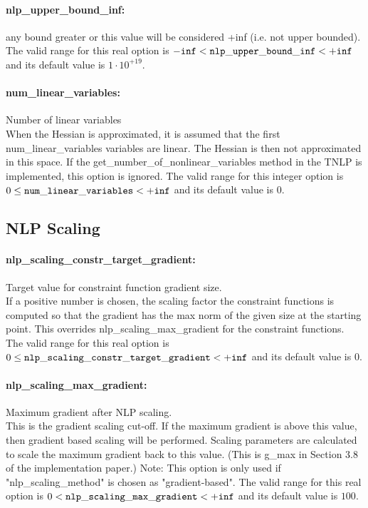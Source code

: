 \paragraph{nlp\_upper\_bound\_inf:}\label{opt:nlp_upper_bound_inf} any bound greater or this value will be considered +inf (i.e. not upper bounded). \\
 The valid range for this real option is 
${\tt -inf} <  {\tt nlp\_upper\_bound\_inf } <  {\tt +inf}$
and its default value is $1 \cdot 10^{+19}$.


\paragraph{num\_linear\_variables:}\label{opt:num_linear_variables} Number of linear variables \\
 When the Hessian is approximated, it is assumed that the first num\_linear\_variables variables are linear.  The Hessian is then not approximated in this space.  If the get\_number\_of\_nonlinear\_variables method in the TNLP is implemented, this option is ignored. The valid range for this integer option is
$0 \le {\tt num\_linear\_variables } <  {\tt +inf}$
and its default value is $0$.


\subsection{NLP Scaling}
\label{sec:NLPScaling}
\paragraph{nlp\_scaling\_constr\_target\_gradient:}\label{opt:nlp_scaling_constr_target_gradient} Target value for constraint function gradient size. \\
 If a positive number is chosen, the scaling factor the constraint functions is computed so that the gradient has the max norm of the given size at the starting point.  This overrides nlp\_scaling\_max\_gradient for the constraint functions. The valid range for this real option is 
$0 \le {\tt nlp\_scaling\_constr\_target\_gradient } <  {\tt +inf}$
and its default value is $0$.


\paragraph{nlp\_scaling\_max\_gradient:}\label{opt:nlp_scaling_max_gradient} Maximum gradient after NLP scaling. \\
 This is the gradient scaling cut-off. If the maximum gradient is above this value, then gradient based scaling will be performed. Scaling parameters are calculated to scale the maximum gradient back to this value. (This is g\_max in Section 3.8 of the implementation paper.) Note: This option is only used if "nlp\_scaling\_method" is chosen as "gradient-based". The valid range for this real option is 
$0 <  {\tt nlp\_scaling\_max\_gradient } <  {\tt +inf}$
and its default value is $100$.


